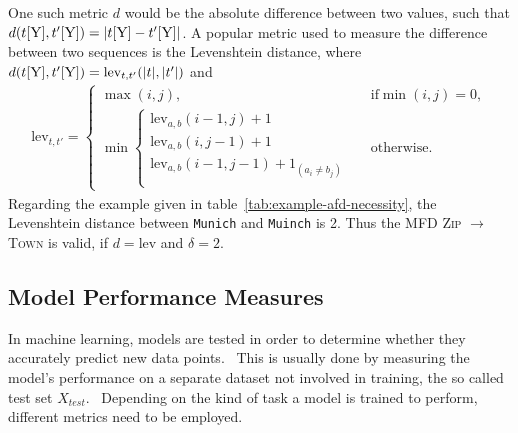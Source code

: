 One such metric \( d \) would be the absolute difference between two values, such that \( d(t[\textsc{Y}], t'[\textsc{Y}]) = | t[\textsc{Y}] - t'[\textsc{Y}]| \).
A popular metric used to measure the difference between two sequences is the Levenshtein distance, where \( d(t[\textsc{Y}], t'[\textsc{Y}]) = \text{lev}_{t,t'}(|t|, |t'|) \) and
\begin{align*}
    \text{lev}_{t,t'} =
    \begin{cases}
        \max(i,j),  & \text{if} \min(i,j)=0, \\
        \min \begin{cases}
            \text{lev}_{a, b}(i-1, j)+1 & \\
            \text{lev}_{a, b}(i, j-1)+1 & \\
            \text{lev}_{a, b}(i-1, j-1)+1_{(a_i \neq b_j)} \\
        \end{cases} & \text{otherwise.}
    \end{cases}
\end{align*}
Regarding the example given in table~\ref{tab:example-afd-necessity}, the Levenshtein distance between \texttt{Munich} and \texttt{Muinch} is 2.
Thus the MFD \textsc{Zip} \( \to\) \textsc{Town} is valid, if \( d = \text{lev} \) and \( \delta = 2 \).

\subsection{Model Performance Measures}
In machine learning, models are tested in order to determine whether they accurately predict new data points.~\cite[p.~32]{BIS06}
This is usually done by measuring the model's performance on a separate dataset not involved in training, the so called test set \( X_{test} \).~\cite[p.~6]{BIS06}
Depending on the kind of task a model is trained to perform, different metrics need to be employed.

